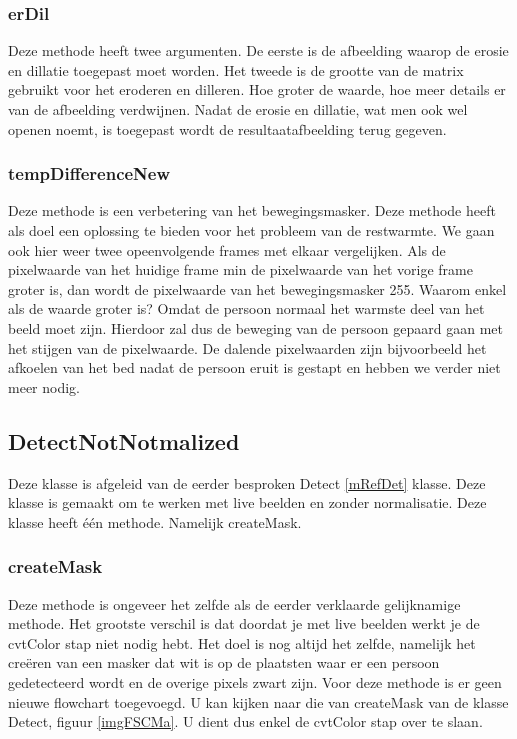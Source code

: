  
 \subsubsection{erDil}
Deze methode heeft twee argumenten. De eerste is de afbeelding waarop de erosie en dillatie toegepast moet worden. Het tweede is de grootte van de matrix gebruikt voor het eroderen en dilleren. Hoe groter de waarde, hoe meer details er van de afbeelding verdwijnen. Nadat de erosie en dillatie, wat men ook wel openen noemt, is toegepast wordt de resultaatafbeelding terug gegeven. 
 
 \subsubsection{tempDifferenceNew}
Deze methode is een verbetering van het bewegingsmasker. Deze methode heeft als doel een oplossing te bieden voor het probleem van de restwarmte. We gaan ook hier weer twee opeenvolgende frames met elkaar vergelijken. Als de pixelwaarde van het huidige frame min de pixelwaarde van het vorige frame groter is, dan wordt de pixelwaarde van het bewegingsmasker 255. Waarom enkel als de waarde groter is? Omdat de persoon normaal het warmste deel van het beeld moet zijn. Hierdoor zal dus de beweging van de persoon gepaard gaan met het stijgen van de pixelwaarde. De dalende pixelwaarden zijn bijvoorbeeld het afkoelen van het bed nadat de persoon eruit is gestapt en hebben we verder niet meer nodig.
 
 \subsection{DetectNotNotmalized}
 \label{mRefDNN}
Deze klasse is afgeleid van de eerder besproken Detect \ref{mRefDet} klasse. Deze klasse is gemaakt om te werken met live beelden en zonder normalisatie. Deze klasse heeft \'e\'en methode. Namelijk createMask.
 
 \subsubsection{createMask}
 Deze methode is ongeveer het zelfde als de eerder verklaarde gelijknamige methode. Het grootste verschil is dat doordat je met live beelden werkt je de cvtColor stap niet nodig hebt. Het doel is nog altijd het zelfde, namelijk het cre\"eren van een masker dat wit is op de plaatsten waar er een persoon gedetecteerd wordt en de overige pixels zwart zijn. Voor deze methode is er geen nieuwe flowchart toegevoegd. U kan kijken naar die van createMask van de klasse Detect, figuur \ref{imgFSCMa}. U dient dus enkel de cvtColor stap over te slaan. 
 
